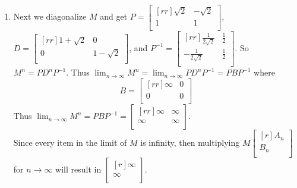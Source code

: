 \documentclass[12pt]{article}
\theoremstyle{definition}
\theoremstyle{plain}
\begin{document}
\begin{enumerate}
\begin{enumerate}
\item Next we diagonalize $M$ and get $P=\begin{bmatrix}[rr]\sqrt{2}&-\sqrt{2}\\1&1\\\end{bmatrix}$, $D=\begin{bmatrix}[rr]1+\sqrt{2}&0\\0&1-\sqrt{2}\\\end{bmatrix}$, and $P^{-1}=\begin{bmatrix}[rr]\frac{1}{2\sqrt{2}}&\frac{1}{2}\\-\frac{1}{2\sqrt{2}}&\frac{1}{2}\\\end{bmatrix}$. So $M^n=PD^nP^{-1}$. Thus $\lim_{n\rightarrow\infty}M^n=\lim_{n\rightarrow\infty}PD^nP^{-1}=PBP^{-1}$ where
\[ B=\begin{bmatrix}[rr]\infty &0\\0&0\\\end{bmatrix} \]
Thus $\lim_{n\rightarrow\infty}M^n = PBP^{-1}=\begin{bmatrix}[rr]\infty&\infty\\\infty&\infty\\\end{bmatrix}$.\\
Since every item in the limit of $M$ is infinity, then multiplying $M\begin{bmatrix}[r]A_n\\B_n\\\end{bmatrix}$ for $n\rightarrow\infty$ will result in $\begin{bmatrix}[r]\infty\\\infty\\\end{bmatrix}$.\\ 
\end{enumerate}


\end{enumerate}
\end{document}
